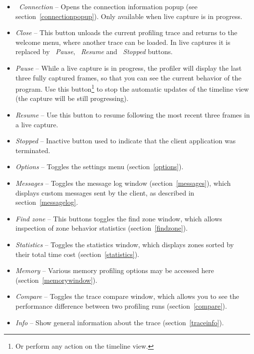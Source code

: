 \documentclass[hidelinks,titlepage,a4paper]{article}
\begin{document}
\begin{itemize}
\item \emph{\faWifi{}~Connection} -- Opens the connection information popup (see section~\ref{connectionpopup}). Only available when live capture is in progress.
\item \emph{\faPowerOff{} Close} -- This button unloads the current profiling trace and returns to the welcome menu, where another trace can be loaded. In live captures it is replaced by \emph{\faPause{}~Pause}, \emph{\faPlay{}~Resume} and \emph{\faSquare{}~Stopped} buttons.
\item \emph{\faPause{} Pause} -- While a live capture is in progress, the profiler will display the last three fully captured frames, so that you can see the current behavior of the program. Use this button\footnote{Or perform any action on the timeline view.} to stop the automatic updates of the timeline view (the capture will be still progressing).
\item \emph{\faPlay{} Resume} -- Use this button to resume following the most recent three frames in a live capture.
\item \emph{\faSquare{} Stopped} -- Inactive button used to indicate that the client application was terminated.
\item \emph{\faCog{} Options} -- Toggles the settings menu (section~\ref{options}).
\item \emph{\faTags{} Messages} -- Toggles the message log window (section~\ref{messages}), which displays custom messages sent by the client, as described in section~\ref{messagelog}.
\item \emph{\faSearch{} Find zone} -- This buttons toggles the find zone window, which allows inspection of zone behavior statistics (section~\ref{findzone}).
\item \emph{\faSortAmountUp{} Statistics} -- Toggles the statistics window, which displays zones sorted by their total time cost (section~\ref{statistics}).
\item \emph{\faMemory{} Memory} -- Various memory profiling options may be accessed here (section~\ref{memorywindow}).
\item \emph{\faBalanceScale{} Compare} -- Toggles the trace compare window, which allows you to see the performance difference between two profiling runs (section~\ref{compare}).
\item \emph{\faFingerprint{} Info} -- Show general information about the trace (section~\ref{traceinfo}).
\end{itemize}
\end{document}
